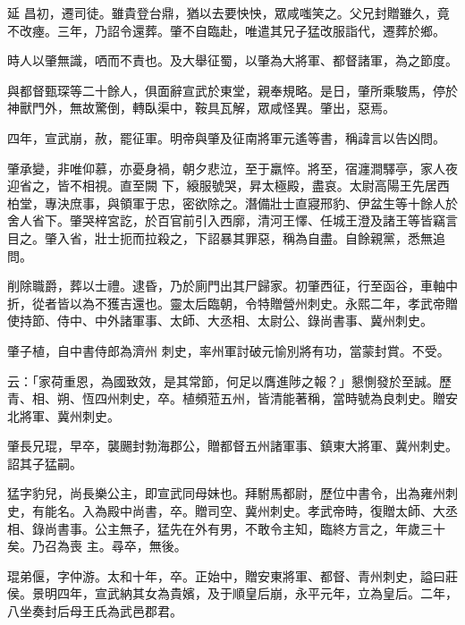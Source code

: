\begin{pinyinscope}
 延
 昌初，遷司徒。雖貴登台鼎，猶以去要怏怏，眾咸嗤笑之。父兄封贈雖久，竟不改瘞。三年，乃詔令還葬。肇不自臨赴，唯遣其兄子猛改服詣代，遷葬於鄉。



 時人以肇無識，哂而不責也。及大舉征蜀，以肇為大將軍、都督諸軍，為之節度。



 與都督甄琛等二十餘人，俱面辭宣武於東堂，親奉規略。是日，肇所乘駿馬，停於神獸門外，無故驚倒，轉臥渠中，鞍具瓦解，眾咸怪異。肇出，惡焉。



 四年，宣武崩，赦，罷征軍。明帝與肇及征南將軍元遙等書，稱諱言以告凶問。



 肇承變，非唯仰慕，亦憂身禍，朝夕悲泣，至于羸悴。將至，宿瀍澗驛亭，家人夜迎省之，皆不相視。直至闕
 下，縗服號哭，昇太極殿，盡哀。太尉高陽王先居西柏堂，專決庶事，與領軍于忠，密欲除之。潛備壯士直寢邢豹、伊盆生等十餘人於舍人省下。肇哭梓宮訖，於百官前引入西廓，清河王懌、任城王澄及諸王等皆竊言目之。肇入省，壯士扼而拉殺之，下詔暴其罪惡，稱為自盡。自餘親黨，悉無追問。



 削除職爵，葬以士禮。逮昏，乃於廁門出其尸歸家。初肇西征，行至函谷，車軸中折，從者皆以為不獲吉還也。靈太后臨朝，令特贈營州刺史。永熙二年，孝武帝贈使持節、侍中、中外諸軍事、太師、大丞相、太尉公、錄尚書事、冀州刺史。



 肇子植，自中書侍郎為濟州
 刺史，率州軍討破元愉別將有功，當蒙封賞。不受。



 云：「家荷重恩，為國致效，是其常節，何足以膺進陟之報？」懇惻發於至誠。歷青、相、朔、恆四州刺史，卒。植頻蒞五州，皆清能著稱，當時號為良刺史。贈安北將軍、冀州刺史。



 肇長兄琨，早卒，襲颺封勃海郡公，贈都督五州諸軍事、鎮東大將軍、冀州刺史。詔其子猛嗣。



 猛字豹兒，尚長樂公主，即宣武同母妹也。拜駙馬都尉，歷位中書令，出為雍州刺史，有能名。入為殿中尚書，卒。贈司空、冀州刺史。孝武帝時，復贈太師、大丞相、錄尚書事。公主無子，猛先在外有男，不敢令主知，臨終方言之，年歲三十矣。乃召為喪
 主。尋卒，無後。



 琨弟偃，字仲游。太和十年，卒。正始中，贈安東將軍、都督、青州刺史，謚曰莊侯。景明四年，宣武納其女為貴嬪，及于順皇后崩，永平元年，立為皇后。二年，八坐奏封后母王氏為武邑郡君。




\end{pinyinscope}
